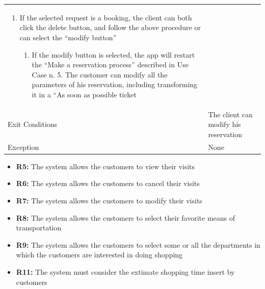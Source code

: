 \documentclass{article}
\newcommand\xrowht[2][0]
{\addstackgap[.5\dimexpr#2\relax]{\vphantom{#1}}}
\begin{document}
\begin{center}
\begin{adjustwidth}{-2.8cm}{}
\begin{tabular}[h!]{|m{7.5em}|m{36em}|}
\begin{enumerate}
\begin{enumerate}
									\item If the selected request is a booking, the client can both click the delete button, and follow the above procedure or can select the “modify button”
									
									\begin{enumerate}
										
										\item If the modify button is selected, the app will restart the “Make a reservation process” described in Use Case n. 5. The customer can modify all the parameters of his reservation, including transforming it in a “As soon as possible ticket
										 
									\end{enumerate}
									
								\end{enumerate}
								
							\end{enumerate}\\
							\xrowht{5pt}
							Exit Conditions & The client can modify his reservation\\
							\xrowht{5pt}
							Exception & None\\	
							\hline
							
						\end{tabular}
					\end{adjustwidth}
					\begin{itemize}
						\medskip
						\newpage
						{\bfseries Required functional requirements: }
						
						
						\item {\bfseries R5: } The system allows the customers to view their visits
						\item {\bfseries R6: } The system allows the customers to cancel their visits
						\item {\bfseries R7: } The system allows the customers to modify their visits
						
						\item {\bfseries R8: } The system allows the customers to select their favorite means of transportation
						\item {\bfseries R9: } The system allows the customers to select some or all the departments in
						which the customers are interested in doing shopping
						\item {\bfseries R11: } The system must consider the extimate shopping time insert by customers
						

\end{itemize}
\end{center}
\end{document}
